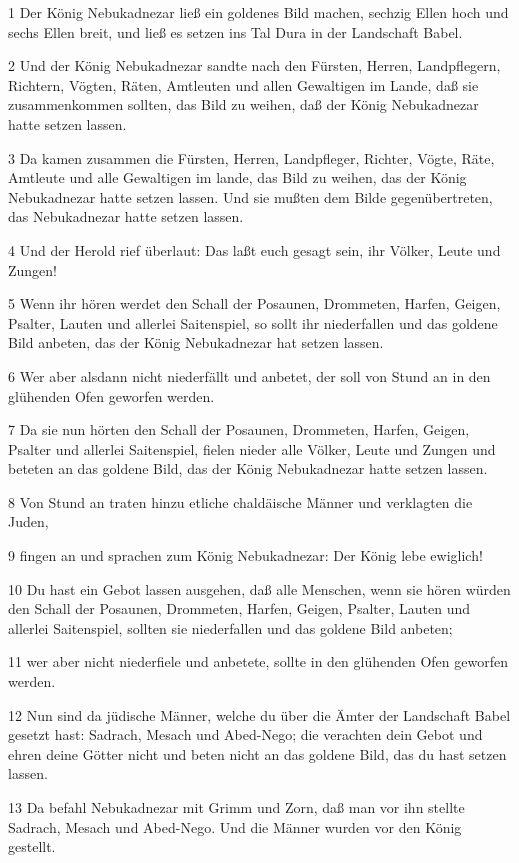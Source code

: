 \par 1 Der König Nebukadnezar ließ ein goldenes Bild machen, sechzig Ellen hoch und sechs Ellen breit, und ließ es setzen ins Tal Dura in der Landschaft Babel.
\par 2 Und der König Nebukadnezar sandte nach den Fürsten, Herren, Landpflegern, Richtern, Vögten, Räten, Amtleuten und allen Gewaltigen im Lande, daß sie zusammenkommen sollten, das Bild zu weihen, daß der König Nebukadnezar hatte setzen lassen.
\par 3 Da kamen zusammen die Fürsten, Herren, Landpfleger, Richter, Vögte, Räte, Amtleute und alle Gewaltigen im lande, das Bild zu weihen, das der König Nebukadnezar hatte setzen lassen. Und sie mußten dem Bilde gegenübertreten, das Nebukadnezar hatte setzen lassen.
\par 4 Und der Herold rief überlaut: Das laßt euch gesagt sein, ihr Völker, Leute und Zungen!
\par 5 Wenn ihr hören werdet den Schall der Posaunen, Drommeten, Harfen, Geigen, Psalter, Lauten und allerlei Saitenspiel, so sollt ihr niederfallen und das goldene Bild anbeten, das der König Nebukadnezar hat setzen lassen.
\par 6 Wer aber alsdann nicht niederfällt und anbetet, der soll von Stund an in den glühenden Ofen geworfen werden.
\par 7 Da sie nun hörten den Schall der Posaunen, Drommeten, Harfen, Geigen, Psalter und allerlei Saitenspiel, fielen nieder alle Völker, Leute und Zungen und beteten an das goldene Bild, das der König Nebukadnezar hatte setzen lassen.
\par 8 Von Stund an traten hinzu etliche chaldäische Männer und verklagten die Juden,
\par 9 fingen an und sprachen zum König Nebukadnezar: Der König lebe ewiglich!
\par 10 Du hast ein Gebot lassen ausgehen, daß alle Menschen, wenn sie hören würden den Schall der Posaunen, Drommeten, Harfen, Geigen, Psalter, Lauten und allerlei Saitenspiel, sollten sie niederfallen und das goldene Bild anbeten;
\par 11 wer aber nicht niederfiele und anbetete, sollte in den glühenden Ofen geworfen werden.
\par 12 Nun sind da jüdische Männer, welche du über die Ämter der Landschaft Babel gesetzt hast: Sadrach, Mesach und Abed-Nego; die verachten dein Gebot und ehren deine Götter nicht und beten nicht an das goldene Bild, das du hast setzen lassen.
\par 13 Da befahl Nebukadnezar mit Grimm und Zorn, daß man vor ihn stellte Sadrach, Mesach und Abed-Nego. Und die Männer wurden vor den König gestellt.
